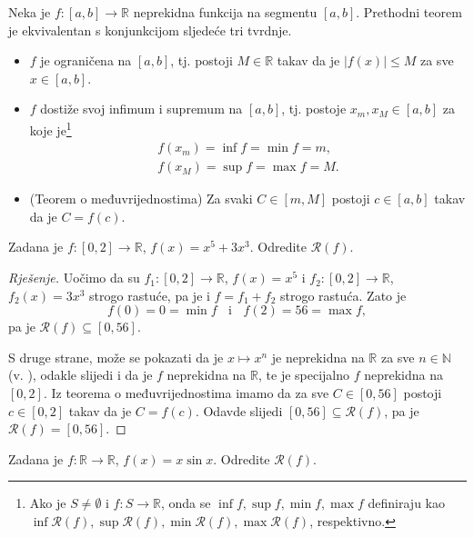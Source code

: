 \begin{remark}
Neka je $f : [a, b]\to \mathbb{R}$ neprekidna funkcija na segmentu $[a, b]$. Prethodni teorem je ekvivalentan s konjunkcijom sljedeće tri tvrdnje.
\begin{itemize}
\item $f$ je ograničena na $[a, b]$, tj. postoji $M\in \mathbb{R}$ takav da je $|f(x)|\leq M$ za sve $x\in [a, b]$.
\item $f$ dostiže svoj infimum i supremum na $[a, b]$, tj. postoje $x_m, x_M\in [a, b]$ za koje je\footnote{Ako je $S\neq \emptyset$ i $f : S\to \mathbb{R}$, onda se $\inf{f}, \sup{f}, \min{f}, \max{f}$ definiraju kao $\inf{\mathcal{R}(f)}, \sup{\mathcal{R}(f)}, \min{\mathcal{R}(f)}, \max{\mathcal{R}(f)}$, respektivno.} 
\begin{gather*}
f(x_m)=\inf{f}=\min{f}=m,\\
f(x_M)=\sup{f}=\max{f}=M.
\end{gather*}
\item (Teorem o međuvrijednostima) Za svaki $C\in [m, M]$ postoji $c\in [a, b]$ takav da je $C=f(c)$.
\end{itemize}
\end{remark}
\newpage
\begin{exercise}
\label{imgcont1}
Zadana je $f : [0, 2]\to \mathbb{R}$, $f(x)=x^5+3x^3$. Odredite $\mathcal{R}(f)$.
\end{exercise}
\begin{proof}[Rješenje]
Uočimo da su $f_1 : [0, 2]\to \mathbb{R}$, $f(x)=x^5$ i $f_2 : [0, 2]\to \mathbb{R}$, $f_2(x)=3x^3$ strogo rastuće, pa je i $f=f_1+f_2$ strogo rastuća. Zato je $$f(0)=0=\min{f}\;\;\text{ i }\;\;f(2)=56=\max{f},$$
pa je $\mathcal{R}(f)\subseteq [0, 56]$.

S druge strane, može se pokazati da je $x\mapsto x^n$ je neprekidna na $\mathbb{R}$ za sve $n\in \mathbb{N}$ (v. \cite{3}), odakle slijedi i da je $f$ neprekidna na $\mathbb{R}$, te je specijalno $f$ neprekidna na $[0, 2]$. Iz teorema o međuvrijednostima imamo da za sve $C\in [0, 56]$ postoji $c\in [0, 2]$ takav da je $C=f(c)$. Odavde slijedi $[0, 56]\subseteq \mathcal{R}(f)$, pa je $\mathcal{R}(f)=[0, 56]$.
\end{proof}
\begin{exercise}
Zadana je $f : \mathbb{R}\to \mathbb{R}$, $f(x)=x\sin{x}$. Odredite $\mathcal{R}(f)$.
\end{exercise}
